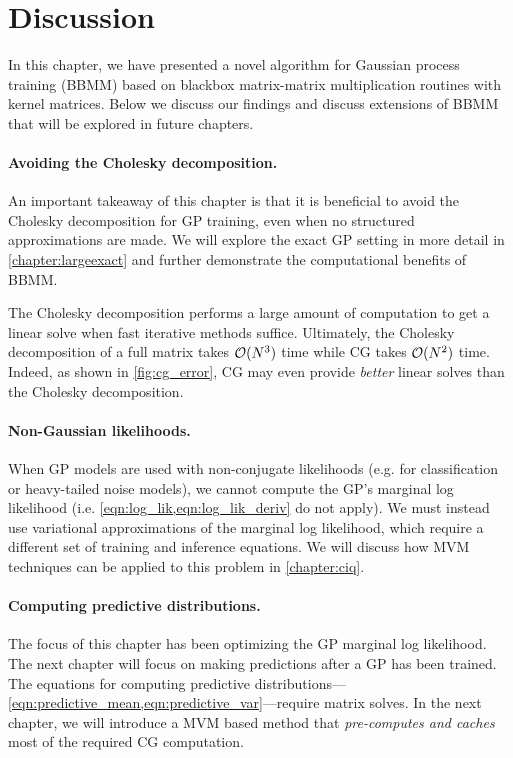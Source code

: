 \section{Discussion}
In this chapter, we have presented a novel algorithm for Gaussian process training (BBMM) based on blackbox matrix-matrix multiplication routines with kernel matrices.
Below we discuss our findings and discuss extensions of BBMM that will be explored in future chapters.

\paragraph{Avoiding the Cholesky decomposition.}
An important takeaway of this chapter is that it is beneficial to avoid the Cholesky decomposition for GP training, even when no structured approximations are made.
We will explore the exact GP setting in more detail in \cref{chapter:largeexact} and further demonstrate the computational benefits of BBMM.

The Cholesky decomposition performs a large amount of computation to get a linear solve when fast iterative methods suffice.
Ultimately, the Cholesky decomposition of a full matrix takes $\bigo{N^3}$ time while CG takes $\bigo{N^2}$ time.
Indeed, as shown in \cref{fig:cg_error}, CG may even provide \emph{better} linear solves than the Cholesky decomposition.

\paragraph{Non-Gaussian likelihoods.}
When GP models are used with non-conjugate likelihoods (e.g. for classification or heavy-tailed noise models), we cannot compute the GP's marginal log likelihood (i.e. \cref{eqn:log_lik,eqn:log_lik_deriv} do not apply).
We must instead use variational approximations of the marginal log likelihood, which require a different set of training and inference equations.
We will discuss how MVM techniques can be applied to this problem in \cref{chapter:ciq}.

\paragraph{Computing predictive distributions.}
The focus of this chapter has been optimizing the GP marginal log likelihood.
The next chapter will focus on making predictions after a GP has been trained.
The equations for computing predictive distributions---\cref{eqn:predictive_mean,eqn:predictive_var}---require matrix solves.
In the next chapter, we will introduce a MVM based method that \emph{pre-computes and caches} most of the required CG computation.
